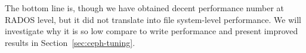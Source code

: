 The bottom line is, though we have obtained decent performance number at RADOS
level, but it did not translate into file system-level performance. We will
investigate why it is so low compare to write performance and present improved
results in Section~\ref{sec:ceph-tuning}.











